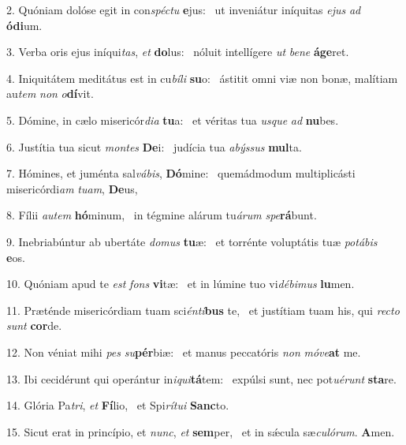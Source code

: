 2. Quóniam dolóse egit in con\textit{spéc}\textit{tu} \textbf{e}jus: \ast\  ut inveniátur iníquitas \textit{e}\textit{jus} \textit{ad} \textbf{ó}\textbf{di}um.\

3. Verba oris ejus iníqui\textit{tas}, \textit{et} \textbf{do}lus: \ast\  nóluit intellígere \textit{ut} \textit{be}\textit{ne} \textbf{á}\textbf{ge}ret.\

4. Iniquitátem meditátus est in cu\textit{bí}\textit{li} \textbf{su}o: \ast\  ástitit omni viæ non bonæ, malítiam au\textit{tem} \textit{non} \textit{o}\textbf{dí}vit.\

5. Dómine, in cælo misericór\textit{di}\textit{a} \textbf{tu}a: \ast\  et véritas tua \textit{us}\textit{que} \textit{ad} \textbf{nu}bes.\

6. Justítia tua sicut \textit{mon}\textit{tes} \textbf{De}i: \ast\  judícia tua \textit{a}\textit{býs}\textit{sus} \textbf{mul}ta.\

7. Hómines, et juménta sal\textit{vá}\textit{bis}, \textbf{Dó}mine: \ast\  quemádmodum multiplicásti misericórdi\textit{am} \textit{tu}\textit{am}, \textbf{De}us,\

8. Fílii \textit{au}\textit{tem} \textbf{hó}minum, \ast\  in tégmine alárum tu\textit{á}\textit{rum} \textit{spe}\textbf{rá}bunt.\

9. Inebriabúntur ab ubertáte \textit{do}\textit{mus} \textbf{tu}æ: \ast\  et torrénte voluptátis tuæ \textit{po}\textit{tá}\textit{bis} \textbf{e}os.\

10. Quóniam apud te \textit{est} \textit{fons} \textbf{vi}tæ: \ast\  et in lúmine tuo vi\textit{dé}\textit{bi}\textit{mus} \textbf{lu}men.\

11. Præténde misericórdiam tuam sci\textit{én}\textit{ti}\textbf{bus} te, \ast\  et justítiam tuam his, qui \textit{rec}\textit{to} \textit{sunt} \textbf{cor}de.\

12. Non véniat mihi \textit{pes} \textit{su}\textbf{pér}biæ: \ast\  et manus peccatóris \textit{non} \textit{mó}\textit{ve}\textbf{at} me.\

13. Ibi cecidérunt qui operántur in\textit{i}\textit{qui}\textbf{tá}tem: \ast\  expúlsi sunt, nec pot\textit{u}\textit{é}\textit{runt} \textbf{sta}re.\

14. Glória Pa\textit{tri}, \textit{et} \textbf{Fí}lio, \ast\  et Spi\textit{rí}\textit{tu}\textit{i} \textbf{Sanc}to.\

15. Sicut erat in princípio, et \textit{nunc}, \textit{et} \textbf{sem}per, \ast\  et in sǽcula sæ\textit{cu}\textit{ló}\textit{rum}. \textbf{A}men.\

